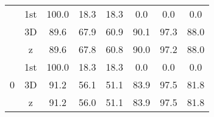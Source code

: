 \begin{table}[h!]
\begin{center}
\begin{tabular}{c c c c c c c c}
                        & 1st & 100.0 & 18.3 & 18.3 & 0.0 & 0.0 & 0.0 \\
\cmidrule{2-8}
                        & 3D & 89.6 & 67.9 & 60.9 & 90.1 & 97.3 & 88.0 \\
\cmidrule{2-8}
                        & z    & 89.6 & 67.8 & 60.8 & 90.0 & 97.2 & 88.0 \\
\midrule
\multirow{3}{*}{0} 
                        & 1st & 100.0 & 18.3 & 18.3 & 0.0 & 0.0 & 0.0 \\
\cmidrule{2-8}
                        & 3D & 91.2 & 56.1 & 51.1 & 83.9 & 97.5 & 81.8 \\
\cmidrule{2-8}
                        & z    & 91.2 & 56.0 & 51.1 & 83.9 & 97.5 & 81.8 \\

\end{tabular}

\end{center}
\end{table}
